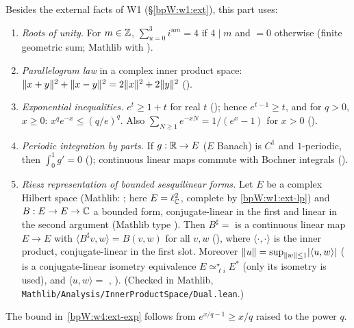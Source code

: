 Besides the external facts of W1 (\S\ref{bpW:w1:ext}), this part uses:
{\raggedright
\begin{enumerate}[label=(W4-E\arabic*),ref=(W4-E\arabic*)]
\item\label{bpW:w4:ext-roots} \emph{Roots of unity.} For $m\in\mathbb{Z}$, $\sum_{u=0}^{3}i^{um}=4$ if $4\mid m$ and $=0$
  otherwise (finite geometric sum; Mathlib  with ).
\item\label{bpW:w4:ext-parallelogram} \emph{Parallelogram law} in a complex inner product space:
  $\lVert x+y\rVert^2+\lVert x-y\rVert^2=2\lVert x\rVert^2+2\lVert y\rVert^2$ ().
\item\label{bpW:w4:ext-exp} \emph{Exponential inequalities.} $e^t\ge1+t$ for real $t$
  (); hence $e^{t-1}\ge t$, and for $q>0$, $x\ge0$: $x^qe^{-x}\le(q/e)^q$. Also
  $\sum_{N\ge1}e^{-xN}=1/(e^x-1)$ for $x>0$ ().
\item\label{bpW:w4:ext-intparts} \emph{Periodic integration by parts.} If $g:\mathbb{R}\to E$ ($E$ Banach) is $C^1$ and
  $1$-periodic, then $\int_0^1g'=0$ (); continuous linear maps
  commute with Bochner integrals ().
\item\label{bpW:w4:ext-riesz} \emph{Riesz representation of bounded sesquilinear forms.} Let $E$ be a complex
  Hilbert space (Mathlib: ; here
  $E=\ell^2_{\mathbb{C}}$, complete by \ref{bpW:w1:ext-lp}) and $B:E\to E\to\mathbb{C}$ a bounded form, conjugate-linear in the first
  and linear in the second argument (Mathlib type ). Then
  $B^\sharp=$  is a continuous linear map $E\to E$ with
  $\langle B^\sharp v,w\rangle=B(v,w)$ for all $v,w$ (), where
  $\langle\cdot,\cdot\rangle$ is the inner product, conjugate-linear in the first slot. Moreover
  $\lVert u\rVert=\sup_{\lVert w\rVert\le1}\lvert \langle u,w\rangle\rvert$ ( is a conjugate-linear isometry equivalence
  $E\simeq_{\ell i}^{\star}E^*$ (only its isometry is used), and $\langle u,w\rangle=$ , ).
  (Checked in Mathlib, \texttt{Mathlib/Analysis/InnerProductSpace/Dual.lean}.)
\end{enumerate}
\par}
The bound in~\ref{bpW:w4:ext-exp} follows from $e^{x/q-1}\ge x/q$ raised to the power $q$.

